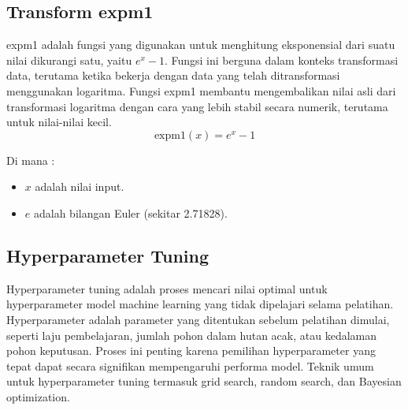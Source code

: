 \subsection{Transform expm1}
expm1 adalah fungsi yang digunakan untuk menghitung eksponensial dari suatu nilai dikurangi satu, yaitu $e^x - 1$. Fungsi ini berguna dalam konteks transformasi data, terutama ketika bekerja dengan data yang telah ditransformasi menggunakan logaritma. Fungsi expm1 membantu mengembalikan nilai asli dari transformasi logaritma dengan cara yang lebih stabil secara numerik, terutama untuk nilai-nilai kecil.
\begin{equation}
    \text{expm1}(x) = e^x - 1
\end{equation}

Di mana :
\begin{itemize}
    \item $x$ adalah nilai input.
    \item $e$ adalah bilangan Euler (sekitar 2.71828).
\end{itemize}

\subsection{Hyperparameter Tuning}

Hyperparameter tuning adalah proses mencari nilai optimal untuk hyperparameter model machine learning yang tidak dipelajari selama pelatihan. Hyperparameter adalah parameter yang ditentukan sebelum pelatihan dimulai, seperti laju pembelajaran, jumlah pohon dalam hutan acak, atau kedalaman pohon keputusan. Proses ini penting karena pemilihan hyperparameter yang tepat dapat secara signifikan mempengaruhi performa model. Teknik umum untuk hyperparameter tuning termasuk grid search, random search, dan Bayesian optimization.

